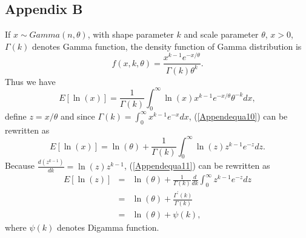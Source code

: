 \documentclass[12pt,letter,final]{article}
\begin{document}
\begin{spacing}{2.5}
\begin{appendices}
\section{Appendix B}
If $x\sim Gamma(n, \theta)$, with shape parameter $k$ and scale parameter $\theta$, $x>0$, $\Gamma(k)$ denotes Gamma function, the density function of Gamma distribution is
\begin{equation}
f(x,k,\theta)=\frac{x^{k-1}e^{-x/\theta}}{\Gamma(k)\theta^{k}}.
\label{Appendequa9}
\end{equation}
Thus we have 
\begin{equation}
E[\ln(x)]=\frac{1}{\Gamma(k)}\int_{0}^{\infty}\ln(x)x^{k-1}e^{-x/\theta}\theta^{-k}dx,
\label{Appendequa10}
\end{equation}
define $z=x/\theta$ and since $\Gamma(k)=\int_{0}^{\infty}x^{k-1}e^{-x}dx$, (\ref{Appendequa10}) can be rewritten as
\begin{equation}
E[\ln(x)]=\ln(\theta)+\frac{1}{\Gamma(k)}\int_{0}^{\infty}\ln(z)z^{k-1}e^{-z}dz.
\label{Appendequa11}
\end{equation}
Because $\frac{d(z^{k-1})}{dk}=\ln(z)z^{k-1}$, (\ref{Appendequa11}) can be rewritten as
\begin{eqnarray}
\nonumber
E[\ln(z)]&=&\ln(\theta)+\frac{1}{\Gamma(k)}\frac{d}{dk}\int_{0}^{\infty}z^{k-1}e^{-z}dz\\
\nonumber
&=&\ln(\theta)+\frac{\Gamma^{'}(k)}{\Gamma(k)}\\
\nonumber
&=&\ln(\theta)+\psi(k),
\label{Appendequa12}
\end{eqnarray}
where $\psi(k)$ denotes Digamma function.

\end{appendices}





\end{spacing}


\end{document}
